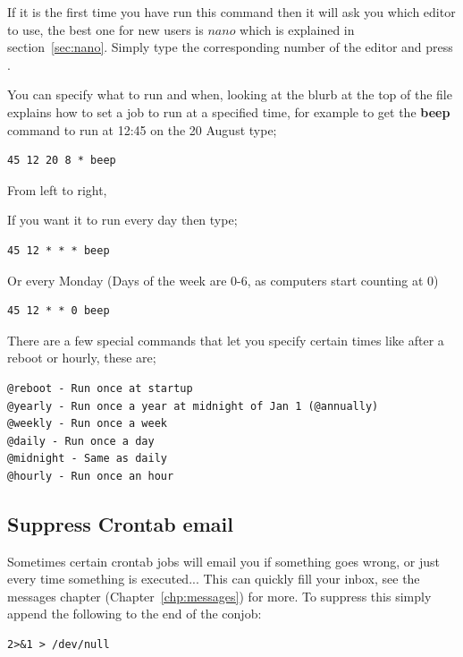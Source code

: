If it is the first time you have run this command then it will ask you which editor to use, the best one for new users is $nano$ which is explained in section~\ref{sec:nano}.  Simply type the corresponding number of the editor and press \keys{\enter}.

You can specify what to run and when, looking at the blurb at the top of the file explains how to set a job to run at a specified time, for example to get the \textbf{beep} command to run at 12:45 on the 20 August type;

\begin{lstlisting}
45 12 20 8 * beep
\end{lstlisting}

From left to right, 

If you want it to run every day then type;

\begin{lstlisting}
45 12 * * * beep
\end{lstlisting}

Or every Monday (Days of the week are 0-6, as computers start counting at 0)

\begin{lstlisting}
45 12 * * 0 beep
\end{lstlisting}

There are a few special commands that let you specify certain times like after a reboot or hourly, these are;

\begin{lstlisting}
@reboot - Run once at startup
@yearly - Run once a year at midnight of Jan 1 (@annually)
@weekly - Run once a week
@daily - Run once a day
@midnight - Same as daily
@hourly - Run once an hour
\end{lstlisting}

\subsection{Suppress Crontab email}

Sometimes certain crontab jobs will email you if something goes wrong, or just every time something is executed... This can quickly fill your inbox, see the messages chapter (Chapter~\ref{chp:messages}) for more.  To suppress this simply append the following to the end of the conjob:

\begin{lstlisting}
2>&1 > /dev/null
\end{lstlisting}


